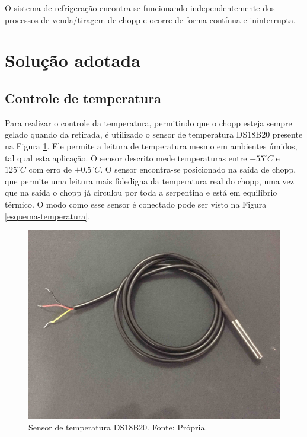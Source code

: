 O sistema de refrigeração encontra-se funcionando independentemente dos processos de venda/tiragem de chopp e ocorre de forma
contínua e ininterrupta.

\section{Solução adotada}

\subsection{Controle de temperatura}

Para realizar o controle da temperatura, permitindo que o chopp esteja sempre gelado quando da retirada, 
é utilizado o sensor de temperatura DS18B20 presente na Figura \ref{sensor-temperatura}. 
Ele  permite a leitura de temperatura  mesmo em ambientes úmidos, tal qual esta aplicação. 
O sensor descrito mede temperaturas entre   $ -55 ^\circ C$ e $125 ^\circ C$ com erro de $\pm 0.5 ^\circ C$.
O sensor encontra-se posicionado na saída de chopp, que permite uma leitura mais fidedigna da
temperatura real do chopp, uma vez que  na saída o chopp já circulou por toda a serpentina e está em
equilíbrio térmico. O modo como esse sensor é conectado pode ser visto na Figura \ref{esquema-temperatura}.

\begin{figure}[!htb]
            \centering
         	\includegraphics[scale= 0.08]{figuras/temperatura.jpg}
            \caption{Sensor de temperatura DS18B20. Fonte: Própria.}
            \label{sensor-temperatura}
\end{figure}
               
